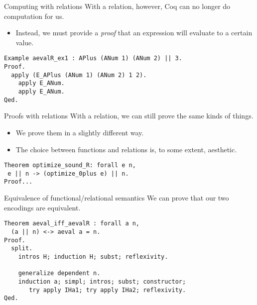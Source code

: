 \begin{frame}[fragile]{Computing with relations}
With a relation, however, Coq can no longer do computation for us.

\begin{itemize}
\item Instead, we must provide a \emph{proof} that an expression will evaluate 
to a certain value.
\end{itemize}
\begin{block}{}
\small\begin{verbatim}
Example aevalR_ex1 : APlus (ANum 1) (ANum 2) || 3.
Proof.
  apply (E_APlus (ANum 1) (ANum 2) 1 2).
    apply E_ANum.
    apply E_ANum.
Qed.
\end{verbatim}
\end{block}
\end{frame}

\begin{frame}[fragile]{Proofs with relations}
With a relation, we can still prove the same kinds of things.

\begin{itemize}
\item We prove them in a slightly different way.
\item The choice between functions and relations is, to some extent, aesthetic.
\end{itemize}

\begin{block}{}
\small\begin{verbatim}
Theorem optimize_sound_R: forall e n,
 e || n -> (optimize_0plus e) || n.
Proof...
\end{verbatim}
\end{block}
\end{frame}

\begin{frame}[fragile]{Equivalence of functional/relational semantics}
We can prove that our two encodings are equivalent.

\begin{block}{}
\small\begin{verbatim}
Theorem aeval_iff_aevalR : forall a n,
  (a || n) <-> aeval a = n.
Proof.
  split.
    intros H; induction H; subst; reflexivity. 

    generalize dependent n.
    induction a; simpl; intros; subst; constructor;
       try apply IHa1; try apply IHa2; reflexivity. 
Qed.
\end{verbatim}
\end{block}
\end{frame}
